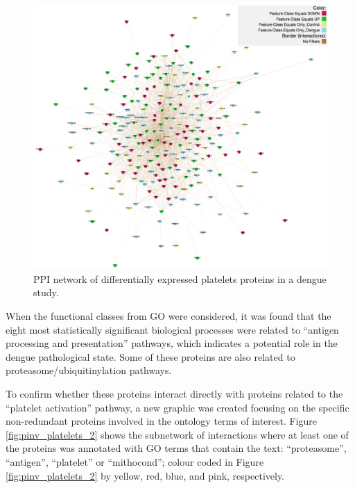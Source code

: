\begin{figure}
\centering
\includegraphics[width=\textwidth]{figures/pinv_platelets_1.png}
\caption[PPI network of differentially expressed platelets proteins in a dengue study.]{PPI network of differentially expressed platelets proteins in a dengue study.
\label{fig:pinv_platelets_1}}
\end{figure}

When the functional classes from GO were considered, it was found that the eight most statistically significant biological processes were related to ``antigen processing and presentation'' pathways, which indicates a potential role in the dengue pathological state. Some of these proteins are also related to proteasome/ubiquitinylation pathways.

To confirm whether these proteins interact directly with proteins related to the ``platelet activation'' pathway, a new graphic was created focusing on the specific non-redundant proteins involved in the ontology terms of interest. Figure \ref{fig:pinv_platelets_2} shows the subnetwork of interactions where at least one of the proteins was annotated with GO terms that contain the text: ``proteasome'', ``antigen'', ``platelet'' or ``mithocond''; colour coded in Figure \ref{fig:pinv_platelets_2} by yellow, red, blue, and pink, respectively.

